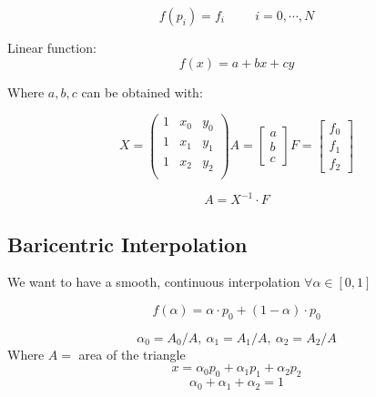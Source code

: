 $$f(p_i) = f_i \hspace{1cm} i = 0, \cdots, N$$

Linear function:
$$f(x) = a + bx + cy$$

Where $a, b, c$ can be obtained with:

$$
    X = \begin{pmatrix}
        1 & x_0 & y_0 \\
        1 & x_1 & y_1 \\
        1 & x_2 & y_2 \\
    \end{pmatrix}
    A = \begin{bmatrix}
        a \\ b \\ c
    \end{bmatrix}
    F = \begin{bmatrix}
        f_0 \\ f_1 \\ f_2
    \end{bmatrix}
$$

$$A = X^{-1} \cdot F$$

\subsection{Baricentric Interpolation}

We want to have a smooth, continuous interpolation $\forall \alpha \in [0, 1]$

$$f(\alpha) = \alpha \cdot p_0 + (1 - \alpha) \cdot p_0$$

\begin{center}
\end{center}

$$\alpha_0 = A_0 / A , \ \alpha_1 = A_1 / A , \ \alpha_2 = A_2 / A$$
Where $A =$ area of the triangle
$$x = \alpha_0 p_0 + \alpha_1 p_1 + \alpha_2 p_2$$
$$\alpha_0 + \alpha_1 + \alpha_2 = 1$$


